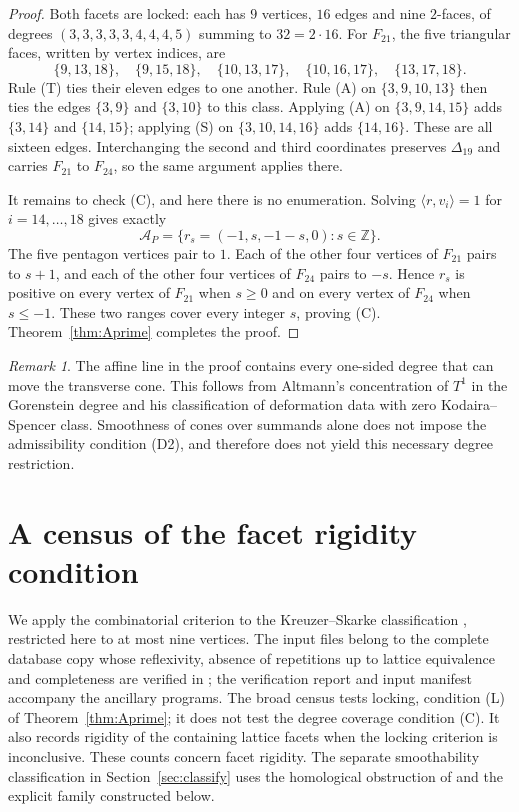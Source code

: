 \documentclass[11pt]{amsart}
\theoremstyle{definition}
\theoremstyle{remark}
\newtheorem{remark}[theorem]{Remark}
\theoremstyle{plain}
\newcommand{\ZZ}{\mathbb{Z}}
\newcommand{\cA}{\mathcal{A}}
\begin{document}
\begin{proof}
Both facets are locked: each has $9$ vertices, $16$ edges and nine $2$-faces,
of degrees $(3,3,3,3,3,4,4,4,5)$ summing to $32=2\cdot16$.
For $F_{21}$, the five triangular faces, written by vertex indices, are
\[
 \{9,13,18\},\quad\{9,15,18\},\quad\{10,13,17\},\quad
 \{10,16,17\},\quad\{13,17,18\}.
\]
Rule (T) ties their eleven edges to one another.  Rule (A) on
$\{3,9,10,13\}$ then ties the edges $\{3,9\}$ and $\{3,10\}$ to this
class.  Applying (A) on $\{3,9,14,15\}$ adds $\{3,14\}$ and
$\{14,15\}$; applying (S) on $\{3,10,14,16\}$ adds $\{14,16\}$.
These are all sixteen edges.  Interchanging the second and third
coordinates preserves $\Delta_{19}$ and carries $F_{21}$ to $F_{24}$,
so the same argument applies there.

It remains to check (C), and here there is no enumeration.  Solving
$\langle r,v_i\rangle=1$ for $i=14,\ldots,18$ gives exactly
\[
  \cA_P=\{r_s=(-1,s,-1-s,0):s\in\ZZ\}.
\]
The five pentagon vertices pair to $1$.  Each of the other four vertices of
$F_{21}$ pairs to $s+1$, and each of the other four vertices of $F_{24}$ pairs
to $-s$.  Hence $r_s$ is positive on every vertex of $F_{21}$ when $s\ge0$ and
on every vertex of $F_{24}$ when $s\le-1$.  These two ranges cover every
integer $s$, proving (C).  Theorem~\ref{thm:Aprime} completes the proof.
\end{proof}



\begin{remark}\label{rem:whatfailedfirst}
The affine line in the proof contains every one-sided degree that can
move the transverse cone.  This follows from Altmann's concentration
of $T^1$ in the Gorenstein degree and his classification of deformation
data with zero Kodaira--Spencer class.  Smoothness of cones over
summands alone does not impose the admissibility condition (D2), and
therefore does not yield this necessary degree restriction.
\end{remark}

\section{A census of the facet rigidity condition}\label{sec:census}

We apply the combinatorial criterion to the Kreuzer--Skarke
classification \cite{KS00}, restricted here to at most nine vertices.
The input files belong to the complete database copy whose reflexivity,
absence of repetitions up to lattice equivalence and completeness are
verified in \cite[\S6.1]{PaperI}; the verification report and input
manifest accompany the ancillary programs.  The broad census tests locking, condition
{\rm(L)} of Theorem~\ref{thm:Aprime}; it does not test the degree
coverage condition {\rm(C)}.  It also records rigidity of the
containing lattice facets when the locking criterion is inconclusive.
These counts concern facet rigidity.  The separate smoothability
classification in Section~\ref{sec:classify} uses the homological
obstruction of \cite{PaperIV} and the explicit family constructed below.
\end{document}
